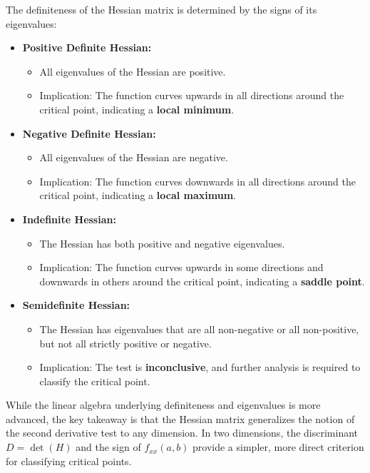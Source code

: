 \noindent The definiteness of the Hessian matrix is determined by the signs of its eigenvalues:    

\begin{itemize}
    \item \textbf{Positive Definite Hessian:}  
    \begin{itemize}
        \item All eigenvalues of the Hessian are positive.
        \item Implication: The function curves upwards in all directions around the critical point, indicating a \textbf{local minimum}.
    \end{itemize}
    
    \item \textbf{Negative Definite Hessian:}  
    \begin{itemize}
        \item All eigenvalues of the Hessian are negative.
        \item Implication: The function curves downwards in all directions around the critical point, indicating a \textbf{local maximum}.
    \end{itemize}
    
    \item \textbf{Indefinite Hessian:}  
    \begin{itemize}
        \item The Hessian has both positive and negative eigenvalues.
        \item Implication: The function curves upwards in some directions and downwards in others around the critical point, indicating a \textbf{saddle point}.
    \end{itemize}
    
    \item \textbf{Semidefinite Hessian:}  
    \begin{itemize}
        \item The Hessian has eigenvalues that are all non-negative or all non-positive, but not all strictly positive or negative.
        \item Implication: The test is \textbf{inconclusive}, and further analysis is required to classify the critical point.
    \end{itemize}
\end{itemize}

\noindent While the linear algebra underlying definiteness and eigenvalues is more advanced, the key takeaway is that the Hessian matrix generalizes the notion of the second derivative test to any dimension. In two dimensions, the discriminant \( D = \det(H) \) and the sign of \( f_{xx}(a,b) \) provide a simpler, more direct criterion for classifying critical points.\\

